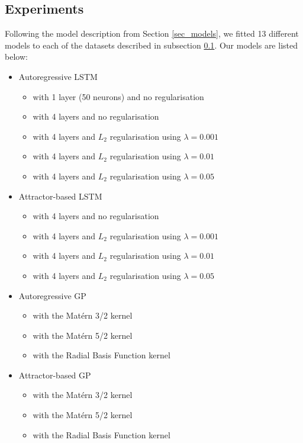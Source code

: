 \documentclass[pdftex,10pt,a4paper,journal]{article}
\theoremstyle{definition}
\theoremstyle{remark}
\begin{document}
\begin{multicols}{2}
\subsection{Experiments} \label{sub_experiments}
Following the model description from Section \ref{sec_models}, we fitted 13 different models to each of the datasets described in subsection \ref{sub_experiments}. Our models are listed below:
\begin{itemize}[noitemsep,topsep=0pt]
\item Autoregressive LSTM 
    \begin{itemize}
        \item with 1 layer (50 neurons) and no regularisation
        \item with 4 layers and no regularisation
        \item with 4 layers and $L_2$ regularisation using $\lambda = 0.001$
        \item with 4 layers and $L_2$ regularisation using $\lambda = 0.01$
        \item with 4 layers and $L_2$ regularisation using $\lambda = 0.05$
    \end{itemize}
\item Attractor-based LSTM
    \begin{itemize}
        \item with 4 layers and no regularisation
        \item with 4 layers and $L_2$ regularisation using $\lambda = 0.001$
        \item with 4 layers and $L_2$ regularisation using $\lambda = 0.01$
        \item with 4 layers and $L_2$ regularisation using $\lambda = 0.05$
    \end{itemize}
\item Autoregressive GP
    \begin{itemize}
        \item with the Mat\'ern 3/2 kernel
        \item with the Mat\'ern 5/2 kernel
        \item with the Radial Basis Function kernel
    \end{itemize}
\item Attractor-based GP
    \begin{itemize}
        \item with the Mat\'ern 3/2 kernel
        \item with the Mat\'ern 5/2 kernel
        \item with the Radial Basis Function kernel
    \end{itemize}
\end{itemize}


\end{multicols}
\end{document}
